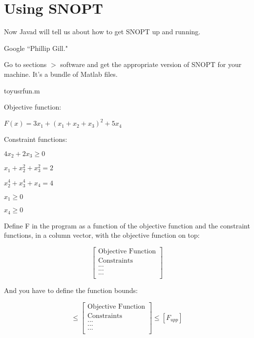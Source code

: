 \chapter{Using SNOPT}
\label{sec:UsingSNOPT}



Now Javad will tell us about how to get SNOPT up and running. 

Google ``Phillip Gill."

Go to sections $>$ software and get the appropriate version of SNOPT for your machine. It's a bundle of Matlab files. 

toyusrfun.m

Objective function:

$F(x) = 3x_{1}+(x_{1}+x_{2}+x_{3})^{2}+5x_{4}$

Constraint functions: 

$4x_{2}+2x_{3} \geq 0$

$x_{1}+x_{2}^{2}+x_{3}^{2}=2$

$x_{2}^{4}+x_{3}^{4}+x_{4}=4$

$x_{1}\geq0$

$x_{4}\geq0$

Define F in the program as a function of the objective function and the constraint functions, in a column vector, with the objective function on top:

\begin{equation}
\begin{bmatrix}
\mbox{Objective Function} \\
\mbox{Constraints} \\
\mbox{...} \\
\mbox{...} \\
\mbox{...} \\
\end{bmatrix}
\label{eq:ObjectiveAndConstraints}
\end{equation}

And you have to define the function bounds:

\begin{equation}
[F_{low}]
\leq
\begin{bmatrix}
\mbox{Objective Function} \\
\mbox{Constraints} \\
\mbox{...} \\
\mbox{...} \\
\mbox{...} \\
\end{bmatrix}
\leq
[F_{upp}]
\label{eq:FunctionBounds}
\end{equation}

